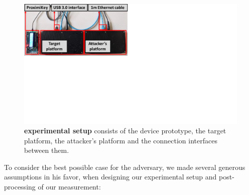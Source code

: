 \begin{figure}[t]
  \centering
    \includegraphics[trim={0 11cm 17cm 0}, clip, width=0.8\linewidth]{chapters/ProximiTEE/figures/Setup2.pdf}
    \caption[\name experimental setup]{\textbf{\name experimental setup} consists of the \device device prototype, the target platform, the attacker's platform and the connection interfaces between them.}

    \label{fig:setup}
\end{figure}

To consider the best possible case for the adversary, we made several generous assumptions in his favor, when designing our experimental setup and post-processing of our measurement:


